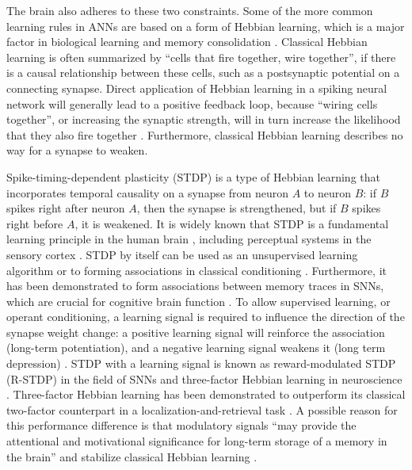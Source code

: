 	The brain also adheres to these two constraints.
	Some of the more common learning rules in ANNs are based on a form of Hebbian learning, which is a major factor in biological learning and memory consolidation \citep{schuman2017survey}.
	Classical Hebbian learning is often summarized by ``cells that fire together, wire together'', if there is a causal relationship between these cells, such as a postsynaptic potential on a connecting synapse.
	Direct application of Hebbian learning in a spiking neural network will generally lead to a positive feedback loop, because ``wiring cells together'', or increasing the synaptic strength, will in turn increase the likelihood that they also fire together \citep{zenke2017temporal}.
	Furthermore, classical Hebbian learning describes no way for a synapse to weaken.

	Spike-timing-dependent plasticity (STDP) \citep{abbott2000synaptic,caporale2008spike} is a type of Hebbian learning that incorporates temporal causality on a synapse from neuron $A$ to neuron $B$: if $B$ spikes right after neuron $A$, then the synapse is strengthened, but if $B$ spikes right before $A$, it is weakened.
	It is widely known that STDP is a fundamental learning principle in the human brain \citep{kandel2000principles,caporale2008spike}, including perceptual systems in the sensory cortex \citep{huang2014associative}.
	STDP by itself can be used as an unsupervised learning algorithm or to forming associations in classical conditioning \citep{diehl2015unsupervised,kim2018demonstration}.
	Furthermore, it has been demonstrated to form associations between memory traces in SNNs, which are crucial for cognitive brain function \citep{pokorny2020stdp}.
	To allow supervised learning, or operant conditioning, a learning signal is required to influence the direction of the synapse weight change: a positive learning signal will reinforce the association (long-term potentiation), and a negative learning signal weakens it (long term depression) \citep{lobov2020spatial}.
	STDP with a learning signal is known as reward-modulated STDP (R-STDP) \citep{legenstein2008learning} in the field of SNNs and three-factor Hebbian learning in neuroscience \citep{fremaux2016neuromodulated}.
	Three-factor Hebbian learning has been demonstrated to outperform its classical two-factor counterpart in a localization-and-retrieval task \citep{porr2007learning}.
	A possible reason for this performance difference is that modulatory signals ``may provide the attentional and motivational significance for long-term storage of a memory in the brain'' and stabilize classical Hebbian learning \citep{bailey2000heterosynaptic}.

